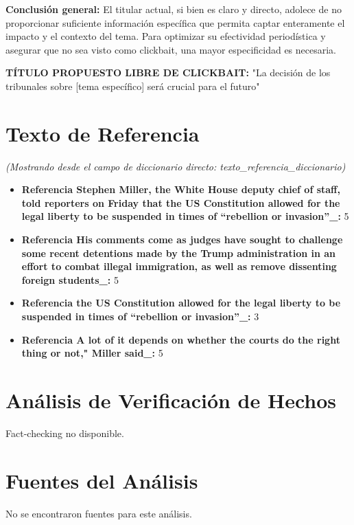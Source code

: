 \documentclass[10pt,a4paper]{article}
\begin{document}
\par\medskip
\textbf{Conclusi\'{o}n general:} El titular actual, si bien es claro y directo, adolece de no proporcionar suficiente informaci\'{o}n espec\'{i}fica que permita captar enteramente el impacto y el contexto del tema. Para optimizar su efectividad period\'{i}stica y asegurar que no sea visto como clickbait, una mayor especificidad es necesaria.
\par\medskip
\textbf{T\'{I}TULO PROPUESTO LIBRE DE CLICKBAIT:}   "La decisi\'{o}n de los tribunales sobre [tema espec\'{i}fico] ser\'{a} crucial para el futuro"
        \vspace{1em}
\vspace{1em}

\section*{Texto de Referencia}
    \textit{(Mostrando desde el campo de diccionario directo: texto\_referencia\_diccionario)}
    \begin{itemize}[leftmargin=*]
            \item \textbf{Referencia Stephen Miller, the White House deputy chief of staff, told reporters on Friday that the US Constitution allowed for the legal liberty to be suspended in times of ``rebellion or invasion''\_:} 5
            \item \textbf{Referencia His comments come as judges have sought to challenge some recent detentions made by the Trump administration in an effort to combat illegal immigration, as well as remove dissenting foreign students\_:} 5
            \item \textbf{Referencia the US Constitution allowed for the legal liberty to be suspended in times of ``rebellion or invasion''\_:} 3
            \item \textbf{Referencia A lot of it depends on whether the courts do the right thing or not," Miller said\_:} 5
    \end{itemize}
\vspace{1em}


\section*{Análisis de Verificación de Hechos}
    Fact-checking no disponible.
\vspace{1em}

\section*{Fuentes del Análisis}
    No se encontraron fuentes para este análisis.
\vspace{1em}
\end{document}
